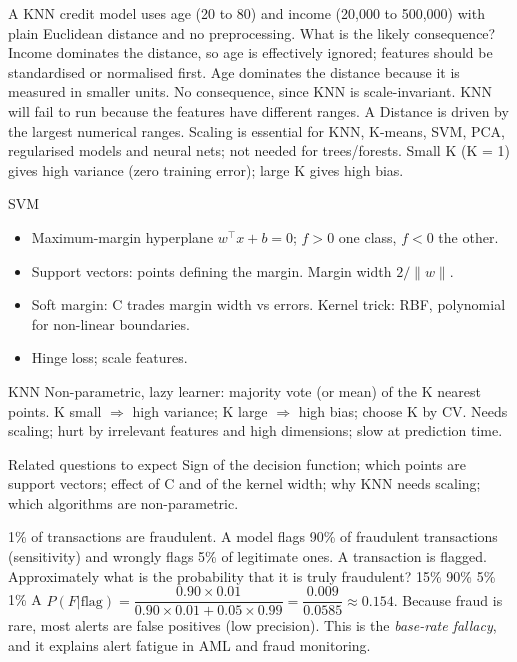 {A KNN credit model uses age (20 to 80) and income (20,000 to 500,000) with plain Euclidean distance and no preprocessing. What is the likely consequence?}
{Income dominates the distance, so age is effectively ignored; features should be standardised or normalised first.}
{Age dominates the distance because it is measured in smaller units.}
{No consequence, since KNN is scale-invariant.}
{KNN will fail to run because the features have different ranges.}
{A}
{Distance is driven by the largest numerical ranges. Scaling is essential for KNN, K-means, SVM, PCA, regularised models and neural nets; not needed for trees/forests. Small K (K = 1) gives high variance (zero training error); large K gives high bias.}

{\begin{block}{SVM}
		\begin{itemize}
			\item Maximum-margin hyperplane $w^\top x+b=0$; $f>0$ one class, $f<0$ the other.
			\item Support vectors: points defining the margin. Margin width $2/\lVert w\rVert$.
			\item Soft margin: C trades margin width vs errors. Kernel trick: RBF, polynomial for non-linear boundaries.
			\item Hinge loss; scale features.
\end{itemize}\end{block}}
{\begin{block}{KNN}
		Non-parametric, lazy learner: majority vote (or mean) of the K nearest points. K small $\Rightarrow$ high variance; K large $\Rightarrow$ high bias; choose K by CV. Needs scaling; hurt by irrelevant features and high dimensions; slow at prediction time.
	\end{block}
	\begin{alertblock}{Related questions to expect}
		Sign of the decision function; which points are support vectors; effect of C and of the kernel width; why KNN needs scaling; which algorithms are non-parametric.
\end{alertblock}}

{1\% of transactions are fraudulent. A model flags 90\% of fraudulent transactions (sensitivity) and wrongly flags 5\% of legitimate ones. A transaction is flagged. Approximately what is the probability that it is truly fraudulent?}
{15\%}
{90\%}
{5\%}
{1\%}
{A}
{$P(F|\text{flag})=\dfrac{0.90\times0.01}{0.90\times0.01+0.05\times0.99}=\dfrac{0.009}{0.0585}\approx0.154$. Because fraud is rare, most alerts are false positives (low precision). This is the \emph{base-rate fallacy}, and it explains alert fatigue in AML and fraud monitoring.}

